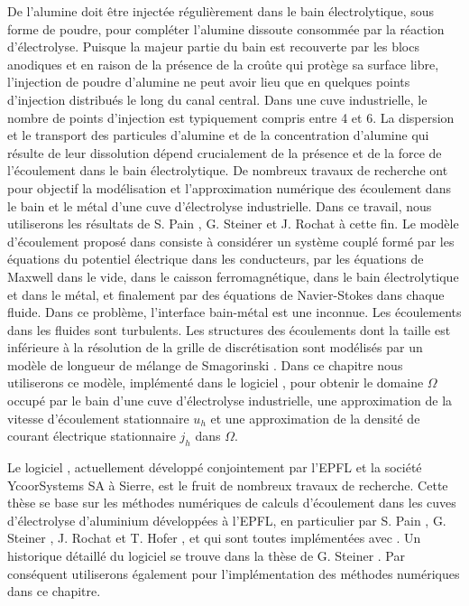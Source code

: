 De l'alumine doit être injectée régulièrement dans le bain
électrolytique, sous forme de poudre, pour compléter l'alumine
dissoute consommée par la réaction d'électrolyse. Puisque la majeur
partie du bain est recouverte par les blocs anodiques et en raison de
la présence de la croûte qui protège sa surface libre, l'injection de
poudre d'alumine ne peut avoir lieu que en quelques points d'injection
distribués le long du canal central. Dans une cuve industrielle, le
nombre de points d'injection est typiquement compris entre 4 et 6. La
dispersion et le transport des particules d'alumine et de la
concentration d'alumine qui résulte de leur dissolution dépend
crucialement de la présence et de la force de l'écoulement dans le
bain électrolytique. De nombreux travaux de recherche ont pour
objectif la modélisation et l'approximation numérique des écoulement
dans le bain et le métal d'une cuve d'électrolyse industrielle. Dans
ce travail, nous utiliserons les résultats de S. Pain \cite{Pain2006},
G. Steiner \cite{Steiner2009} et J. Rochat \cite{Rochat2016} à cette
fin. Le modèle d'écoulement proposé dans \cite{Steiner2009} consiste à
considérer un système couplé formé par les équations du potentiel
électrique dans les conducteurs, par les équations de Maxwell dans le
vide, dans le caisson ferromagnétique, dans le bain électrolytique et
dans le métal, et finalement par des équations de Navier-Stokes dans
chaque fluide. Dans ce problème, l'interface bain-métal est une
inconnue. Les écoulements dans les fluides sont turbulents. Les
structures des écoulements dont la taille est inférieure à la
résolution de la grille de discrétisation sont modélisés par un modèle
de longueur de mélange de Smagorinski \cite{Rochat2016}. Dans ce
chapitre nous utiliserons ce modèle, implémenté dans le logiciel
\citealucell{}, pour obtenir le domaine $\Omega$ occupé par le bain d'une
cuve d'électrolyse industrielle, une approximation de la vitesse
d'écoulement stationnaire $u_h$ et une approximation de la densité de
courant électrique stationnaire $j_h$ dans $\Omega$.

Le logiciel \alucell{}, actuellement développé conjointement par
l'EPFL et la société YcoorSystems SA à Sierre, est le fruit de
nombreux travaux de recherche. Cette thèse se base sur les méthodes
numériques de calculs d'écoulement dans les cuves d'électrolyse
d'aluminium développées à l'EPFL, en particulier par S. Pain
\cite{Pain2006}, G. Steiner \cite{Steiner2009}, J. Rochat
\cite{Rochat2016} et T. Hofer \cite{Hofer2011}, et qui sont toutes
implémentées avec \alucell{}. Un historique détaillé du logiciel se
trouve dans la thèse de G. Steiner \cite{Steiner2009}. Par conséquent
utiliserons également \alucell{} pour l'implémentation des méthodes
numériques dans ce chapitre.

